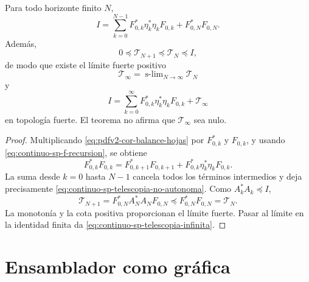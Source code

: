 \begin{theorem}
\label{thm:continuo-sp-telescopia-no-autonoma}
Para todo horizonte finito \(N\),
\begin{equation}
\label{eq:continuo-sp-telescopia-no-autonoma}
 \boxed{
 I=\sum_{k=0}^{N-1}
 F_{0,k}^*\eta_k^*\eta_kF_{0,k}
 +F_{0,N}^*F_{0,N}.}
\end{equation}
Además,
\[
 0\preceq\mathcal T_{N+1}
 \preceq\mathcal T_N\preceq I,
\]
de modo que existe el límite fuerte positivo
\[
 \mathcal T_\infty
 =\operatorname{s-lim}_{N\to\infty}\mathcal T_N
\]
y
\begin{equation}
\label{eq:continuo-sp-telescopia-infinita}
 I=\sum_{k=0}^{\infty}
 F_{0,k}^*\eta_k^*\eta_kF_{0,k}
 +\mathcal T_\infty
\end{equation}
en topología fuerte. El teorema no afirma que
\(\mathcal T_\infty\) sea nulo.
\end{theorem}

\begin{proof}
Multiplicando \eqref{eq:pdfv2-cor-balance-hojas} por
\(F_{0,k}^*\) y \(F_{0,k}\), y usando
\eqref{eq:continuo-sp-f-recursion}, se obtiene
\[
 F_{0,k}^*F_{0,k}
 =F_{0,k+1}^*F_{0,k+1}
  +F_{0,k}^*\eta_k^*\eta_kF_{0,k}.
\]
La suma desde \(k=0\) hasta \(N-1\) cancela todos los términos
intermedios y deja precisamente
\eqref{eq:continuo-sp-telescopia-no-autonoma}. Como
\(A_k^*A_k\preceq I\),
\[
 \mathcal T_{N+1}
 =F_{0,N}^*A_N^*A_NF_{0,N}
 \preceq F_{0,N}^*F_{0,N}=\mathcal T_N.
\]
La monotonía y la cota positiva proporcionan el límite fuerte. Pasar al
límite en la identidad finita da
\eqref{eq:continuo-sp-telescopia-infinita}.
\end{proof}

\iffalse
\section{Ensamblador como gráfica}

